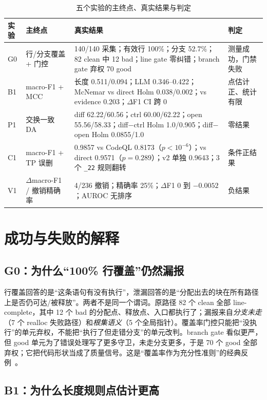 \documentclass[conference]{IEEEtran}
\begin{document}
\begin{table}[t]
\centering
\caption{五个实验的主终点、真实结果与判定}
\label{tab:summary}
\footnotesize
\setlength{\tabcolsep}{4pt}
\begin{tabular}{@{}p{1.5cm}p{3.2cm}p{6.3cm}p{5.4cm}@{}}
\toprule
实验 & 主终点 & 真实结果 & 判定 \\
\midrule
G0 & 行/分支覆盖 + 门控 & 140/140 采集；有效行 100\%；分支 52.7\%；82 clean 中 12 bad；line gate 零纠错；branch gate 弃权 70 good & 测量成功，门禁失败 \\
B1 & macro-F1 + MCC & 长度 0.511/0.094；LLM 0.346--0.422；McNemar vs direct Holm 0.038/0.002；vs evidence 0.203；$\Delta$F1 CI 跨 0 & 点估计正、统计有限 \\
P1 & 交换一致 DA & diff 62.22/60.56；ctrl 60.00/62.22；open 55.56/58.33；diff$-$ctrl Holm 1.0/0.905；diff$-$open Holm 0.0855/1.0 & 零结果 \\
C1 & macro-F1 + TP 误删 & 0.9857 vs CodeQL 0.8173（$p<10^{-6}$）；vs direct 0.9571（$p=0.289$）；v2 单独 0.9643；3 个 \texttt{\_22} 规则翻转 & 条件正结果 \\
V1 & $\Delta$macro-F1 / 撤销精确率 & 4/236 撤销；精确率 25\%；$\Delta$F1 0 到 $-0.0052$；AUROC 无排序 & 负结果 \\
\bottomrule
\end{tabular}
\end{table}

\section{成功与失败的解释}
\label{sec:explain}

\subsection{G0：为什么“100\% 行覆盖”仍然漏报}

行覆盖回答的是“这条语句有没有执行”，泄漏回答的是“分配出去的块在所有路径上是否仍可达/被释放”。两者不是同一个谓词。原路径 82 个 clean 全部 line-complete，其中 12 个 bad 的分配点、释放点、入口都执行了；漏报来自\emph{分支未走}（7 个 realloc 失败路径）和\emph{根集语义}（5 个全局指针）。覆盖率门控只能把“没执行”的单元弃权，不能把“执行了但走错分支”的单元改判。branch gate 看似更严，但 good 单元为了错误处理写了更多守卫，未走分支更多，于是 70 个 good 全部弃权；它把代码形状当成了质量信号。这是“覆盖率作为充分性准则”的经典反例~\cite{zhu1997coverage}。

\subsection{B1：为什么长度规则点估计更高}
\end{document}

